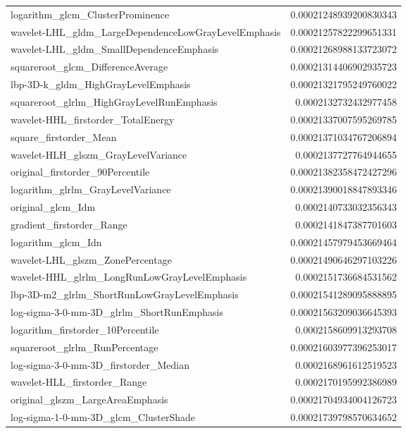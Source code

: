 {\begin{xltabular}[H]{\textwidth}{X r}
        logarithm\_glcm\_ClusterProminence & 0.00021248939200830343 \\
        wavelet-LHL\_gldm\_LargeDependenceLowGrayLevelEmphasis & 0.00021257822299651331 \\
        wavelet-LHL\_gldm\_SmallDependenceEmphasis & 0.00021268988133723072 \\
        squareroot\_glcm\_DifferenceAverage & 0.00021314406902935723 \\
        lbp-3D-k\_gldm\_HighGrayLevelEmphasis & 0.00021321795249760022 \\
        squareroot\_glrlm\_HighGrayLevelRunEmphasis & 0.0002132732432977458 \\
        wavelet-HHL\_firstorder\_TotalEnergy & 0.00021337007595269785 \\
        square\_firstorder\_Mean & 0.00021371034767206894 \\
        wavelet-HLH\_glszm\_GrayLevelVariance & 0.0002137727764944655 \\
        original\_firstorder\_90Percentile & 0.00021382358472427296 \\
        logarithm\_glrlm\_GrayLevelVariance & 0.00021390018847893346 \\
        original\_glcm\_Idm & 0.0002140733032356343 \\
        gradient\_firstorder\_Range & 0.0002141847387701603 \\
        logarithm\_glcm\_Idn & 0.00021457979453669464 \\
        wavelet-LHL\_glszm\_ZonePercentage & 0.00021490646297103226 \\
        wavelet-HHL\_glrlm\_LongRunLowGrayLevelEmphasis & 0.0002151736684531562 \\
        lbp-3D-m2\_glrlm\_ShortRunLowGrayLevelEmphasis & 0.00021541289095888895 \\
        log-sigma-3-0-mm-3D\_glrlm\_ShortRunEmphasis & 0.00021563209036645393 \\
        logarithm\_firstorder\_10Percentile & 0.0002158609913293708 \\
        squareroot\_glrlm\_RunPercentage & 0.00021603977396253017 \\
        log-sigma-3-0-mm-3D\_firstorder\_Median & 0.0002168961612519523 \\
        wavelet-HLL\_firstorder\_Range & 0.0002170195992386989 \\
        original\_glszm\_LargeAreaEmphasis & 0.00021704934004126723 \\
        log-sigma-1-0-mm-3D\_glcm\_ClusterShade & 0.00021739798570634652 \\

\end{xltabular}}

